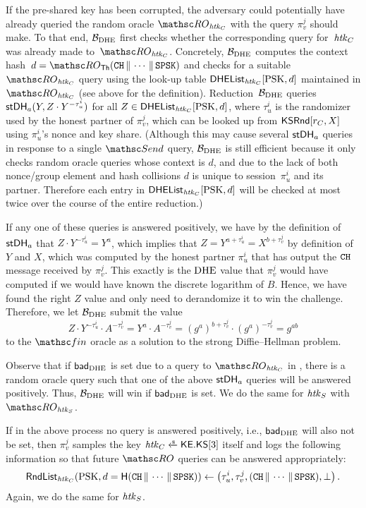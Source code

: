 \begin{enumerate}
		If the pre-shared key has been corrupted, the adversary could potentially have already queried the random oracle $\RO_{\chtk}$ with the query $\pi_v^j$ should make. 
		To that end, $\mathcal{B}_{\mathrm{DHE}}$ first checks whether the corresponding query for~$\mathit{htk}_C$ was already made to~$\RO_{\chtk}$.
		Concretely, $\mathcal{B}_{\mathrm{DHE}}$ computes the context hash~$d = \RO_\Thash(\CH \concat \dotsb \concat \SPSKtls)$ and checks for a suitable $\RO_{\chtk}$ query using the look-up table $\mathsf{DHEList}_{\mathit{htk}_C}[\mathrm{PSK}, d]$ maintained in $\RO_{\chtk}$ (see above for the definition).
		Reduction~$\mathcal{B}_{\mathrm{DHE}}$ queries $\mathsf{stDH}_a(Y, Z \cdot Y^{-\tau_u^i})$ for all $Z \in \mathsf{DHEList}_{\mathit{htk}_C}[\mathrm{PSK}, d]$, where $\tau_u^i$ is the randomizer used by the honest partner of $\pi_v^j$, which can be looked up from $\mathsf{KSRnd}[r_C,X]$ using $\pi_u^i$'s nonce and key share.
		(Although this may cause several $\mathsf{stDH}_a$ queries in response to a single $\Send$ query, $\mathcal{B}_{\mathrm{DHE}}$ is still efficient because it only checks random oracle queries whose context is $d$, and due to the lack of both nonce/group element and hash collisions $d$ is unique to session~$\pi_u^i$ and its partner. Therefore each entry in $\mathsf{DHEList}_{\mathit{htk}_C}[\mathrm{PSK}, d]$ will be checked at most twice over the course of the entire reduction.)
		
		If any one of these queries is answered positively, we have by the definition of $\mathsf{stDH}_a$ that $Z \cdot Y^{-\tau_u^i} = Y^a$, which implies that $Z = Y^{a + \tau_u^i} = X^{b + \tau_v^j}$ by definition of $Y$ and $X$, which was computed by the honest partner $\pi_u^i$ that has output the $\mathtt{CH}$ message received by $\pi_v^j$.
		This exactly is the $\mathrm{DHE}$ value that $\pi_v^j$ would have computed if we would have known the discrete logarithm of $B$.
		Hence, we have found the right $Z$ value and only need to derandomize it to win the challenge.
		Therefore, we let $\mathcal{B}_{\mathrm{DHE}}$ submit the value
		\[
		Z \cdot Y^{-\tau_u^i} \cdot A^{-\tau_v^j} = Y^a \cdot A^{-\tau_v^j} = (g^a)^{b + \tau_v^j} \cdot (g^a)^{-\tau_v^j} = g^{ab}
		\]
	 to the $\Finalize$ oracle as a solution to the strong Diffie--Hellman problem.
		
		Observe that if $\mathsf{bad}_{\mathrm{DHE}}$ is set due to a query to $\ROchtk$ in \thisGame, there is a random oracle query such that one of the above $\mathsf{stDH}_a$ queries will be answered positively. Thus, $\mathcal{B}_{\mathrm{DHE}}$ will win if $\mathsf{bad}_{\mathrm{DHE}}$ is set.
		We do the same for $\mathit{htk}_S$ with $\RO_{\shtk}$.
		
		If in the above process no query is answered positively, i.e., $\mathsf{bad}_{\mathrm{DHE}}$ will also not be set, then $\pi_v^j$ samples the key $\chtk \sample \KEkeyspace[3]$ itself and logs the following information so that future $\RO$ queries can be answered appropriately:
		\[
		\mathsf{RndList}_{\mathit{htk}_C}(\mathrm{PSK}, d = \mathsf{H}(\mathtt{CH} {\,\|\,} \dotsb {\,\|\,} \mathtt{SPSK}) ) \gets \left(  \tau_u^i, \tau_v^j, (\mathtt{CH} {\,\|\,} \dotsb {\,\|\,} \mathtt{SPSK}), \bot \right).
		\]
		Again, we do the same for $\mathit{htk}_S$.
		

\end{enumerate}
